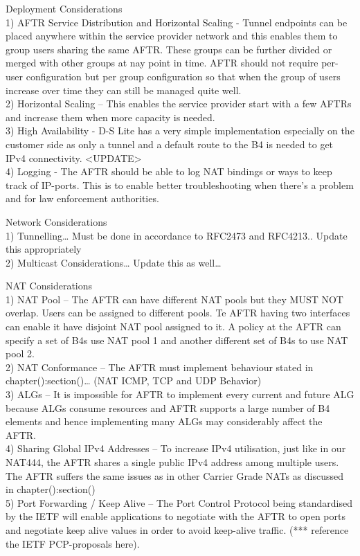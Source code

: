 \documentclass[iwp,first]{luthesis}
\begin{document}
Deployment Considerations
\\1) AFTR Service Distribution and Horizontal Scaling - Tunnel endpoints can be placed anywhere within the service provider network and this enables them to group users sharing the same AFTR. These groups can be further divided or merged with other groups at nay point in time. AFTR should not require per-user configuration but per group configuration so that when the group of users increase over time they can still be managed quite well.
\\2) Horizontal Scaling – This enables the service provider start with a few AFTRs and increase them when more capacity is needed.
\\3) High Availability - D-S Lite has a very simple implementation especially on the customer side as only a tunnel and a default route to the B4 is needed to get IPv4 connectivity. <UPDATE>
\\4) Logging - The AFTR should be able to log NAT bindings or ways to keep track of IP-ports. This is to enable better troubleshooting when there’s a problem and for law enforcement authorities.

Network Considerations
\\1) Tunnelling… Must be done in accordance to RFC2473 and RFC4213.. Update this appropriately
\\2) Multicast Considerations… Update this as well…

NAT Considerations
\\1) NAT Pool – The AFTR can have different NAT pools but they MUST NOT overlap. Users can be assigned to different pools. Te AFTR having two interfaces can enable it have disjoint NAT pool assigned to it. A policy at the AFTR can specify a set of B4s use NAT pool 1 and another different set of B4s to use NAT pool 2.
\\2) NAT Conformance – The AFTR must implement behaviour stated in chapter():section()… (NAT ICMP, TCP and UDP Behavior)
\\3) ALGs – It is impossible for AFTR to implement every current and future ALG because ALGs consume resources and AFTR supports a large number of B4 elements and hence implementing many ALGs may considerably affect the AFTR.
\\4) Sharing Global IPv4 Addresses – To increase IPv4 utilisation, just like in our NAT444, the AFTR shares a single public IPv4 address among multiple users. The AFTR suffers the same issues as in other Carrier Grade NATs as discussed in chapter():section()
\\5) Port Forwarding / Keep Alive – The Port Control Protocol being standardised by the IETF will enable applications to negotiate with the AFTR to open ports and negotiate keep alive values in order to avoid keep-alive traffic. (*** reference the IETF PCP-proposals here).
\end{document}
